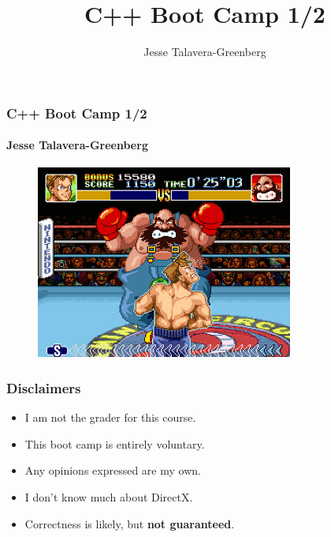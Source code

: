 \documentclass[glossy]{beamer}
\title{C++ Boot Camp 1/2}
\author{Jesse Talavera-Greenberg}
\date{}
\begin{document}
\begin{frame}[fragile=singleslide]
  \frametitle{C++ Boot Camp 1/2}
  \framesubtitle{Jesse Talavera-Greenberg}
  \begin{figure}
    \includegraphics[width=.75\columnwidth]{super-punch-out}
    \centering
  \end{figure}
\end{frame}


\begin{frame}[fragile=singleslide]
  \frametitle{Disclaimers}
  \begin{itemize}
    \item I am not the grader for this course.
    \item This boot camp is entirely voluntary.
    \item Any opinions expressed are my own.
    \item I don't know much about DirectX.
    \item Correctness is likely, but \textbf{not guaranteed}.
  \end{itemize}
\end{frame}

\end{document}

